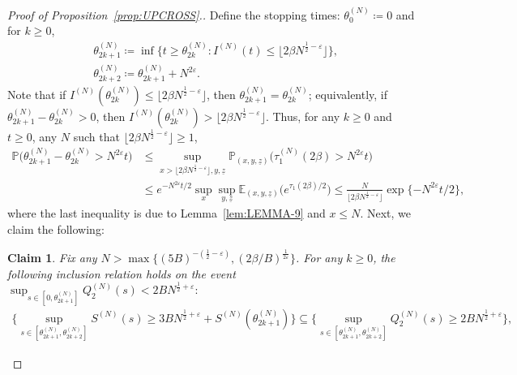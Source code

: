 \documentclass[11pt, reqno]{article}
\newtheorem{claim}[theorem]{Claim}
\numberwithin{equation}{section}
\numberwithin{theorem}{section}
\begin{document}
\begin{proof}[Proof of Proposition~\ref{prop:UPCROSS}.]
Define the stopping times: $\theta^{(N)}_0\coloneqq0$ and for $k\geq 0$, 
\begin{align}
    &\theta^{(N)}_{2k+1}\coloneqq\inf \{t\geq \theta^{(N)}_{2k}:I^{(N)}(t)\leq  \lfloor 2\beta N^{\frac{1}{2}-\varepsilon}\rfloor\},\label{iexc}\\
    &\theta^{(N)}_{2k+2}\coloneqq\theta^{(N)}_{2k+1}+N^{2\varepsilon}.
\end{align}
Note that if $I^{(N)}(\theta^{(N)}_{2k})\leq \lfloor 2\beta N^{\frac{1}{2}-\varepsilon}\rfloor$, then $\theta^{(N)}_{2k+1}=\theta^{(N)}_{2k}$; equivalently, if $\theta^{(N)}_{2k+1}-\theta^{(N)}_{2k}>0$, then $I^{(N)}(\theta^{(N)}_{2k})> \lfloor 2\beta N^{\frac{1}{2}-\varepsilon} \rfloor$.
Thus, for any $k\geq 0$ and $t\geq0$, any $N$ such that $\lfloor 2\beta N^{\frac{1}{2}-\varepsilon}\rfloor \ge 1$,
\begin{equation}\label{eq:lem4.11-1}
    \begin{split}
        \mathbb{P}\big(\theta^{(N)}_{2k+1}-\theta^{(N)}_{2k}>N^{2\varepsilon}t\big)
    &\leq  \sup_{x>\lfloor 2\beta N^{\frac{1}{2}-\varepsilon}\rfloor, y,\underline{z}}\mathbb{P}_{(x,y,\underline{z})}\big(\tau^{(N)}_1(2\beta)>N^{2\varepsilon}t\big)\\
    &\leq  e^{-N^{2\varepsilon}t/2}\sup_{x}\sup_{y,\underline{z}}\mathbb{E}_{(x,y,\underline{z})}\big(e^{\tau_1(2\beta)/2}\big)
    \leq  \frac{N}{\lfloor 2\beta N^{\frac{1}{2}-\varepsilon} \rfloor}\exp \{-N^{2\varepsilon}t/2\},
    \end{split}
\end{equation}
where the last inequality is due to Lemma~\ref{lem:LEMMA-9} and $x\leq N$.
Next, we claim the following:
\begin{claim}\label{claim:4.12-a}
Fix any $N > \max\{(5B)^{-(\frac{1}{2} - \varepsilon)}, (2\beta / B)^{\frac{1}{2\varepsilon}}\}$.
For any $k \ge 0$, the following inclusion relation holds on the event  $\sup_{s\in[0,\theta^{(N)}_{2k+1}]}Q^{(N)}_2(s)<2BN^{\frac{1}{2}+\varepsilon}:$ 
\begin{align}\label{eq:s-q2-subset}
   \Big\{\sup_{s\in[\theta^{(N)}_{2k+1},\theta^{(N)}_{2k+2}]}S^{(N)}(s)\geq 3BN^{\frac{1}{2}+\varepsilon}+S^{(N)}(\theta^{(N)}_{2k+1})\Big\}
   \subseteq \Big\{\sup_{s\in[\theta^{(N)}_{2k+1},\theta^{(N)}_{2k+2}]}Q^{(N)}_2(s)\geq 2BN^{\frac{1}{2}+\varepsilon}\Big\},
\end{align} 
\end{claim}

\end{proof}
\end{document}
